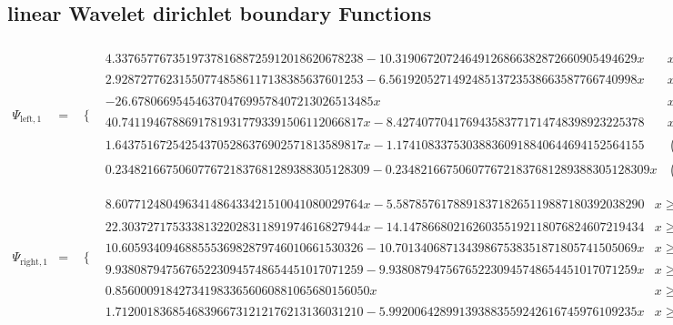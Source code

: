 \documentclass{article}
\begin{document}
 \begin{landscape}
 \subsection{linear Wavelet dirichlet boundary Functions}
 \begin{eqnarray*}
 \Psi_{\text{left},1} & = & \begin{array}{cc}
 \{ & 
\begin{array}{cc}
 4.337657767351973781688725912018620678238-10.31906720724649126866382872660905494629 x & x\geq \frac{1}{4}\land x<\frac{3}{8} \\
 2.928727762315507748586117138385637601253-6.561920527149248513723538663587766740998 x & x\geq \frac{3}{8}\land x<\frac{1}{2} \\
 -26.67806695454637047699578407213026513485 x & x\geq 0\land x<\frac{1}{8} \\
 40.74119467886917819317793391506112066817 x-8.427407704176943583771714748398923225378 & x\geq \frac{1}{8}\land x<\frac{1}{4} \\
 1.643751672542543705286376902571813589817 x-1.174108337530388360918840644694152564155 & \left(x\geq \frac{1}{2}\land x<\frac{5}{8}\right)\lor \left(x\geq \frac{5}{8}\land x<\frac{3}{4}\right) \\
 0.2348216675060776721837681289388305128309-0.2348216675060776721837681289388305128309 x & \left(x\geq \frac{3}{4}\land x<\frac{7}{8}\right)\lor \left(x\geq \frac{7}{8}\land x<1\right)
\end{array}

\end{array}\\ 
\Psi_{\text{right},1} & = & \begin{array}{cc}
 \{ & 
\begin{array}{cc}
 8.607712480496341486433421510041080029764 x-5.587857617889183718265119887180392038290 & x\geq \frac{1}{2}\land x<\frac{5}{8} \\
 22.30372717533381322028311891974616827944 x-14.14786680216260355192118076824607219434 & x\geq \frac{5}{8}\land x<\frac{3}{4} \\
 10.60593409468855536982879746010661530326-10.70134068713439867538351871805741505069 x & x\geq \frac{3}{4}\land x<\frac{7}{8} \\
 9.938087947567652230945748654451017071259-9.938087947567652230945748654451017071259 x & x\geq \frac{7}{8}\land x<1 \\
 0.8560009184273419833656060881065680156050 x & x\geq 0\land x<\frac{1}{4} \\
 1.712001836854683966731212176213136031210-5.992006428991393883559242616745976109235 x & x\geq \frac{1}{4}\land x<\frac{1}{2}
\end{array}

\end{array}\end{eqnarray*}
\end{landscape}
\end{document}
